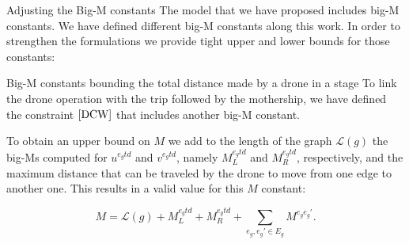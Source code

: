 \documentclass[slidestop,usepdftitle=false,10pt]{beamer}
\begin{document}
	\begin{frame}{Adjusting the Big-M constants}
    The model that we have proposed includes big-M constants. We have defined different big-M constants along this work. In order to strengthen the formulations we provide tight upper and lower bounds for those constants:
    
    \begin{block}{Big-M constants bounding the total distance made by a drone in a stage}
        \footnotesize
        To link the drone operation with the trip followed by the mothership, we have defined the constraint $\eqref{DCW}$ that includes another big-M constant.
        
        \bigskip
        
        To obtain an upper bound on $M$ we add to the length of the graph $\mathcal L(g)$ the big-Ms computed for $u^{e_gtd}$ and $v^{e_gtd}$, namely $M_{L}^{e_gtd}$ and $M_R^{e_gtd}$, respectively, and the maximum distance that can be traveled by the drone to move from one edge to another one. This results in a valid value for this $M$ constant:
        
        $$M = \mathcal{L}(g) + M_L^{e_gtd} + M_R^{e_gtd} + \sum_{e_g, e_g'\in E_g}M^{e_ge_g'}.$$
    \end{block}
	\end{frame}
	
\end{document}
